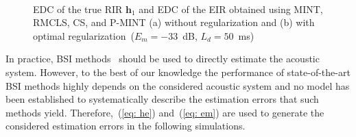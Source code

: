 \documentclass[10pt]{IEEEtran}
\begin{document}
\begin{figure}[b!]
  \centering
  \hbox{
    \hspace{2cm}
    }
  \caption{EDC of the true RIR $\mathbf{h}_1$ and EDC of the EIR obtained using MINT, RMCLS, CS, and P-MINT (a) without regularization and (b) with optimal regularization~($E_m = -33$~dB, $L_d = 50$~ms)}
\end{figure}
In practice, BSI methods~\cite{Hasan_EUSIPCO_2006,Haque_ITASLP_2011} should be used to directly estimate the acoustic system. 
However, to the best of our knowledge the performance of state-of-the-art BSI methods highly depends on the considered acoustic system and no model has been established to systematically describe the estimation errors that such methods yield.
Therefore,~(\ref{eq: he}) and~(\ref{eq: em}) are used to generate the considered estimation errors in the following simulations.
\end{document}
